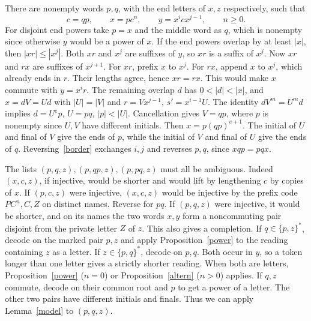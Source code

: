 \documentclass[11pt,a4paper]{article}
\begin{document}
There are nonempty words $p,q$, with the end letters of $x,z$ respectively, such that
\begin{equation}\label{border}
 c=qp,\qquad x=p c^n,\qquad y=x^i c x^{j-1},\qquad n\ge0 .
\end{equation}
For disjoint end powers take $p=x$ and the middle word as $q$, which is nonempty since otherwise $y$ would be a power of $x$. If the end powers overlap by at least $|x|$, then $|xr|\le |x^j|$. Both $xr$ and $x^j$ are suffixes of $y$, so $xr$ is a suffix of $x^j$. Now $xr$ and $rx$ are suffixes of $x^{j+1}$. For $xr$, prefix $x$ to $x^j$. For $rx$, append $x$ to $x^j$, which already ends in $r$. Their lengths agree, hence $xr=rx$. This would make $x$ commute with $y=x^i r$. The remaining overlap $d$ has $0<|d|<|x|$, and $x=dV=U d$ with $|U|=|V|$ and $r=Vx^{j-1}$, $s'=x^{i-1}U$. The identity $dV^m=U^m d$ implies $d=U^e p$, $U=pq$, $|p|<|U|$. Cancellation gives $V=qp$, where $p$ is nonempty since $U,V$ have different initials. Then $x=p(qp)^{e+1}$. The initial of $U$ and final of $V$ give the ends of $p$, while the initial of $V$ and final of $U$ give the ends of $q$. Reversing~\eqref{border} exchanges $i,j$ and reverses $p,q$, since $xqp=pqx$.

The lists $(p,q,z),(p,qp,z),(p,pq,z)$ must all be ambiguous. Indeed $(x,c,z)$, if injective, would be shorter and would lift by lengthening $c$ by copies of $x$. If $(p,c,z)$ were injective, $(x,c,z)$ would be injective by the prefix code $P C^n,C,Z$ on distinct names. Reverse for $pq$. If $(p,q,z)$ were injective, it would be shorter, and on its names the two words $x,y$ form a noncommuting pair disjoint from the private letter $Z$ of $z$. This also gives a completion.
If $q\in\{p,z\}^*$, decode on the marked pair $p,z$ and apply Proposition~\ref{power} to the reading containing $z$ as a letter. If $z\in\{p,q\}^*$, decode on $p,q$. Both occur in $y$, so a token longer than one letter gives a strictly shorter reading. When both are letters, Proposition~\ref{power} ($n=0$) or Proposition~\ref{altern} ($n>0$) applies. If $q,z$ commute, decode on their common root and $p$ to get a power of a letter. The other two pairs have different initials and finals. Thus we can apply Lemma~\ref{model} to $(p,q,z)$.
\end{document}
